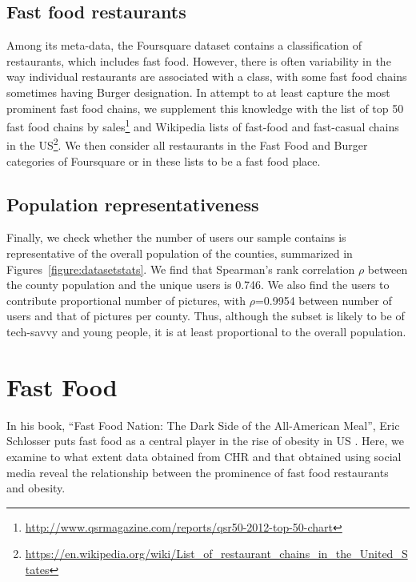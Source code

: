 \documentclass{sig-alternate-2013}
\begin{document}
\subsection{Fast food restaurants}

Among its meta-data, the Foursquare dataset contains a classification of restaurants, which includes fast food. However, there is often variability in the way individual restaurants are associated with a class, with some fast food chains sometimes having Burger designation. In attempt to at least capture the most prominent fast food chains, we supplement this knowledge with the list of top 50 fast food chains by sales\footnote{\url{http://www.qsrmagazine.com/reports/qsr50-2012-top-50-chart}} and Wikipedia lists of fast-food and fast-casual chains in the US\footnote{\url{https://en.wikipedia.org/wiki/List_of_restaurant_chains_in_the_United_States}}. We then consider all restaurants in the Fast Food and Burger categories of Foursquare or in these lists to be a fast food place. 


\subsection{Population representativeness}

Finally, we check whether the number of users our sample contains is representative of the overall population of the counties, summarized in Figures~\ref{figure:datasetstats}. We find that Spearman's rank correlation $\rho$ between the county population and the unique users is 0.746. We also find the users to contribute proportional number of pictures, with $\rho$=0.9954 between number of users and that of pictures per county. Thus, although the subset is likely to be of tech-savvy and young people, it is at least proportional to the overall population. 


\vspace{1cm}
\section{Fast Food}
\label{sec:resultsl}

In his book, ``Fast Food Nation: The Dark Side of the All-American Meal'', Eric Schlosser puts fast food as a central player in the rise of obesity in US \cite{schlosser2012fast}. Here, we examine to what extent data obtained from CHR and that obtained using social media reveal the relationship between the prominence of fast food restaurants and obesity.
\end{document}
